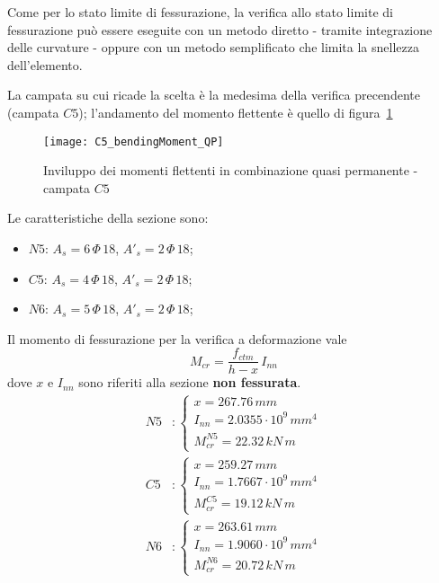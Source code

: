 Come per lo stato limite di fessurazione, la verifica allo stato limite di fessurazione può essere eseguite con un metodo diretto - tramite integrazione delle curvature - oppure con un metodo semplificato che limita la snellezza dell'elemento.

La campata su cui ricade la scelta è la medesima della verifica precendente (campata $C5$); l'andamento del momento flettente è quello di figura~\ref{fig:C5_momento_qp}

\begin{figure}
    \centering
	\texttt{[image: C5\_bendingMoment\_QP]}
	\caption{Inviluppo dei momenti flettenti in combinazione quasi permanente - campata $C5$}
	\label{fig:C5_momento_qp}
\end{figure}

Le caratteristiche della sezione sono:
\begin{itemize}
	\item $N5$: $A_s = 6\,\Phi\,18$, $A'_s = 2\,\Phi\,18$;
	\item $C5$: $A_s = 4\,\Phi\,18$, $A'_s = 2\,\Phi\,18$;
	\item $N6$: $A_s = 5\,\Phi\,18$, $A'_s = 2\,\Phi\,18$;
\end{itemize}

Il momento di fessurazione per la verifica a deformazione vale
\begin{equation}
    \label{eq:Mcr_deformazione}
	M_{cr} = \dfrac{f_{ctm}}{h-x}\,I_{nn}
\end{equation}
dove $x$ e $I_{nn}$ sono riferiti alla sezione \textbf{non fessurata}.
\begin{align*}
    N5&:
	\begin{cases}
	    x = 267.76\,mm\\
		I_{nn} = 2.0355\cdot 10^9\,mm^4\\
		M_{cr}^{N5} = 22.32\,kN\,m
	\end{cases}\\
	C5&:
	\begin{cases}
		x = 259.27\,mm\\
		I_{nn} = 1.7667\cdot 10^9\,mm^4\\
		M_{cr}^{C5} = 19.12\,kN\,m
	\end{cases}\\
	N6&:
	\begin{cases}
		x = 263.61\,mm\\
		I_{nn} = 1.9060\cdot 10^9\,mm^4\\
		M_{cr}^{N6} = 20.72\,kN\,m
	\end{cases}
\end{align*}

